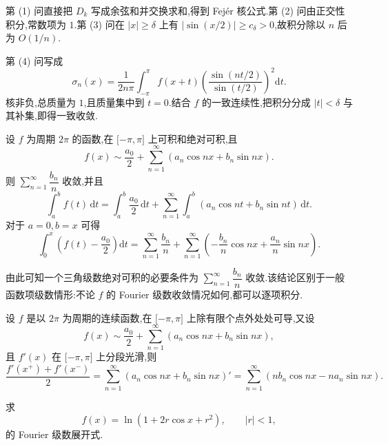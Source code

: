 \begin{solution}
    第 (1) 问直接把 $D_k$ 写成余弦和并交换求和,得到 Fejér 核公式.第 (2) 问由正交性积分,常数项为 $1$.第 (3) 问在 $|x|\geq\delta$ 上有
    $|\sin(x/2)|\geq c_\delta>0$,故积分除以 $n$ 后为 $O(1/n)$.

    第 (4) 问写成
    \[
        \sigma_n(x)=\dfrac{1}{2n\pi}\int_{-\pi}^{\pi}f(x+t)
        \left(\dfrac{\sin(nt/2)}{\sin(t/2)}\right)^2\mathrm{d}t.
    \]
    核非负,总质量为 $1$,且质量集中到 $t=0$.结合 $f$ 的一致连续性,把积分分成 $|t|<\delta$ 与其补集,即得一致收敛.
\end{solution}

\begin{theorem}
    设 $f$ 为周期 $2\pi$ 的函数,在 $\lbrack -\pi,\pi\rbrack$ 上可积和绝对可积,且
    \[
        f(x)\sim\dfrac{a_0}{2}+\sum\limits_{n=1}^{\infty}(a_n\cos nx+b_n\sin nx).
    \]
    则 $\displaystyle\sum\limits_{n=1}^{\infty}\dfrac{b_n}{n}$ 收敛,并且
    \[
        \displaystyle\int_a^bf(t)\,\mathrm{d}t
        =\int_a^b\dfrac{a_0}{2}\,\mathrm{d}t
        +\sum\limits_{n=1}^{\infty}\int_a^b(a_n\cos nt+b_n\sin nt)\,\mathrm{d}t.
    \]
    对于 $a=0,b=x$ 可得
    \[
        \displaystyle\int_0^x\left(f(t)-\dfrac{a_0}{2}\right)\mathrm{d}t
        =\sum\limits_{n=1}^{\infty}\dfrac{b_n}{n}
        +\sum\limits_{n=1}^{\infty}\left(-\dfrac{b_n}{n}\cos nx+\dfrac{a_n}{n}\sin nx\right).
    \]
\end{theorem}

\begin{remark}
    由此可知一个三角级数绝对可积的必要条件为 $\displaystyle\sum\limits_{n=1}^{\infty}\dfrac{b_n}{n}$ 收敛.该结论区别于一般函数项级数情形:不论 $f$ 的 Fourier 级数收敛情况如何,都可以逐项积分.
\end{remark}

\begin{theorem}
    设 $f$ 是以 $2\pi$ 为周期的连续函数,在 $\lbrack -\pi,\pi\rbrack$ 上除有限个点外处处可导,又设
    \[
        f(x)\sim\dfrac{a_0}{2}+\sum\limits_{n=1}^{\infty}(a_n\cos nx+b_n\sin nx),
    \]
    且 $f'(x)$ 在 $\lbrack -\pi,\pi\rbrack$ 上分段光滑,则
    \[
        \dfrac{f'(x^+)+f'(x^-)}{2}
        =\sum\limits_{n=1}^{\infty}(a_n\cos nx+b_n\sin nx)'
        =\sum\limits_{n=1}^{\infty}(nb_n\cos nx-na_n\sin nx).
    \]
\end{theorem}

\begin{example}
    求
    \[
        f(x)=\ln(1+2r\cos x+r^2),
        \qquad |r|<1,
    \]
    的 Fourier 级数展开式.
\end{example}
\exampleblank

